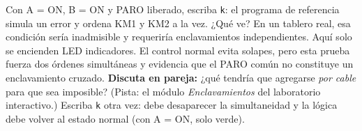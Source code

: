 \documentclass[11pt,a4paper]{article}
\begin{document}
\begin{falla}
Con A = ON, B = ON y PARO liberado, escriba \texttt{k}: el programa de referencia simula un error y ordena KM1 y KM2 a la vez. ¿Qué ve? En un tablero real, esa condición sería inadmisible y requeriría enclavamientos independientes. Aquí solo se encienden LED indicadores. El control normal evita solapes, pero esta prueba fuerza dos órdenes simultáneas y evidencia que el PARO común no constituye un enclavamiento cruzado. \textbf{Discuta en pareja:} ¿qué tendría que agregarse \emph{por cable} para que sea imposible? (Pista: el módulo \emph{Enclavamientos} del laboratorio interactivo.) Escriba \texttt{k} otra vez: debe desaparecer la simultaneidad y la lógica debe volver al estado normal (con A = ON, solo verde).
\end{falla}

\end{document}
